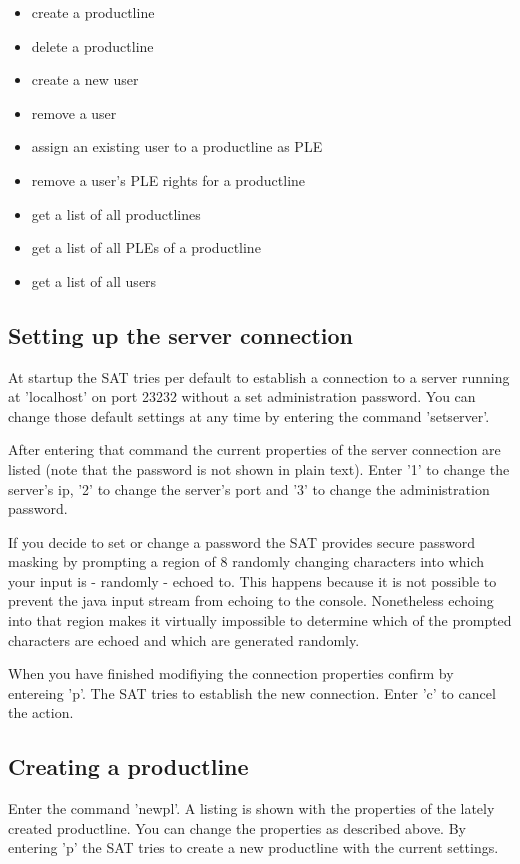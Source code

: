 \begin{itemize}
	\item create a productline
	\item delete a productline
	\item create a new user
	\item remove a user
	\item assign an existing user to a productline as PLE
	\item remove a user's PLE rights for a productline
	\item get a list of all productlines
	\item get a list of all PLEs of a productline
	\item get a list of all users
\end{itemize}




\subsection{Setting up the server connection}
At startup the SAT tries per default to establish a connection to a server running 
at 'localhost' on port 23232 without a set administration password. You can change
those default settings at any time by entering the command 'setserver'.\par

After entering that command the current properties of the server connection are 
listed (note that the password is not shown in plain text). Enter '1' to change
the server's ip, '2' to change the server's port and '3' to change the administration
password.\par

If you decide to set or change a password the SAT provides secure password masking by
prompting a region of 8 randomly changing characters into which your input is - randomly - 
echoed to. This happens because it is not possible to prevent the java input stream from
echoing to the console. Nonetheless echoing into that region makes it virtually impossible 
to determine which of the prompted characters are echoed and which are generated randomly.\par

When you have finished modifiying the connection properties confirm by entereing 'p'. The SAT 
tries to establish the new connection. Enter 'c' to cancel the action.

\subsection{Creating a productline}
Enter the command 'newpl'. A listing is shown with the properties of the lately created
productline. You can change the properties as described above. By entering 'p' the SAT
tries to create a new productline with the current settings. \par

